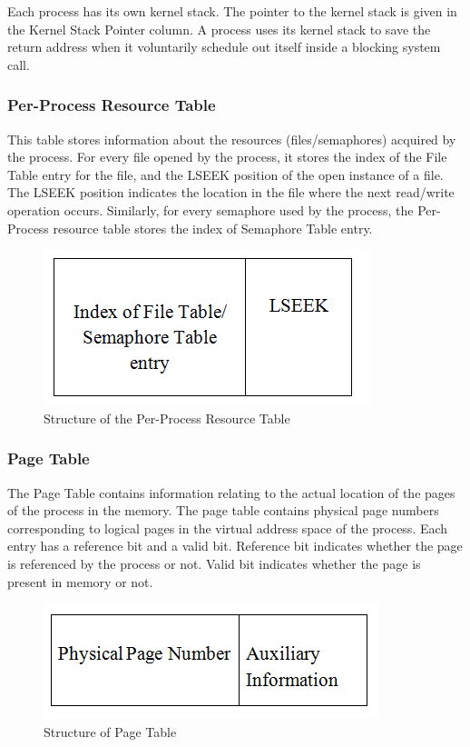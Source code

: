 \documentclass[10pt]{article}
\begin{document}
Each process has its own kernel stack. The pointer to the kernel stack is given in the Kernel Stack Pointer column. A process uses its kernel stack to save the return address when it voluntarily schedule out itself inside a blocking system call. 
\subsubsection{Per-Process Resource Table}
This table stores information about the resources (files/semaphores) acquired by the process. For every file opened by the process, it stores the index of the File Table entry for the file, and the LSEEK position of the open instance of a file. The LSEEK position indicates the location in the file where the next read/write operation occurs. Similarly, for every semaphore used by the process, the Per-Process resource table stores the index of Semaphore Table entry. 
\begin{figure}[ht]
\centering
\includegraphics[scale=0.70]{PerProcessResource_table.png}
\caption{\footnotesize Structure of the Per-Process Resource Table}
\label{fig_3}
\end{figure}

\subsubsection{Page Table}
The Page Table contains information relating to the actual location of the pages of the process in the memory. The page table contains physical page numbers corresponding to logical pages in the virtual address space of the process. Each entry has a reference bit and a valid bit. Reference bit indicates whether the page is referenced by the process or not. Valid bit indicates whether the page is present in memory or not.
\begin{figure}[ht]
\centering
\includegraphics[scale=0.70]{Page_table.png}
\caption{\footnotesize Structure of Page Table}
\label{fig_4}
\end{figure}
\end{document}
